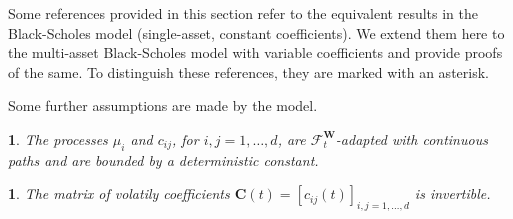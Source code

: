 \documentclass[english]{article}
\numberwithin{equation}{section}
\numberwithin{figure}{section}
\theoremstyle{bolddescit}
\theoremstyle{definition}
\theoremstyle{definition}
\theoremstyle{plain}
\theoremstyle{plain}
\theoremstyle{bolddesc}
\newtheorem{assumption}[theorem]{\protect\assumptionname}
\theoremstyle{plain}
\theoremstyle{remark}
\providecommand{\assumptionname}{Assumption}
\begin{document}
Some references provided in this section refer to the equivalent results in the Black-Scholes model (single-asset, constant coefficients). We extend them here to the multi-asset Black-Scholes model with variable coefficients and provide proofs of the same. To distinguish these references, they are marked with an asterisk.

Some further assumptions are made by the model.

\begin{assumption}\label{ass:drift-vol-regularity}
  The processes $\mu_i$ and $c_{ij}$, for $i,j=1,\ldots,d$, are $\mathcal{F}^\mathbf{W}_t$-adapted with continuous paths and are bounded by a deterministic constant.
\end{assumption}

\begin{assumption}\label{ass:vol-matrix-invertible}
  The matrix of volatily coefficients $\mathbf{C}(t)= [c_{ij}(t)]_{i,j=1,\ldots,d}$ is invertible.
\end{assumption}
\end{document}
